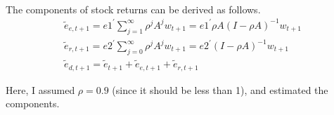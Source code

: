\documentclass[11pt]{article}
\begin{document}
\paragraph{} The components of stock returns can be derived as follows.
\begin{equation}
\begin{array}{c}
\tilde{e}_{e, t+1}=e 1^{\prime} \sum_{j=1}^{\infty} \rho^{j} A^{j} w_{t+1}=e 1^{\prime} \rho A(I-\rho A)^{-1} w_{t+1} \\
\tilde{e}_{r, t+1}=e 2^{\prime} \sum_{j=0}^{\infty} \rho^{j} A^{j} w_{t+1}=e 2^{\prime}(I-\rho A)^{-1} w_{t+1} \\
\tilde{e}_{d, t+1}=\tilde{e}_{t+1}+\tilde{e}_{e, t+1}+\tilde{e}_{r, t+1}
\end{array}
\end{equation}

Here, I assumed $\rho=0.9$ (since it should be less than 1), and estimated the components.
\end{document}
